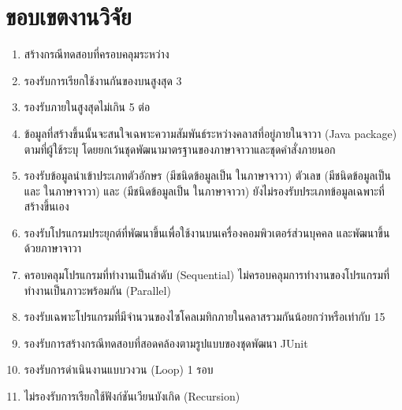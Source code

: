 \section{ขอบเขตงานวิจัย}
\label{sec:limitation}

\begin{enumerate}
    \label{enu:limitation}
    \item สร้างกรณีทดสอบที่ครอบคลุม{\TestPath}ระหว่าง{\CUT} \label{enu:lim:tc}
    \item รองรับการเรียกใช้งานกันของ{\CUT}บน{\TestPath}สูงสุด 3 {\class} \label{enu:lim:3linkingclass}
    \item รองรับ{\method}ภายใน{\CUT}สูงสุดไม่เกิน 5 {\method}ต่อ{\class} \label{enu:lim:5methods}
    \item ข้อมูล{\scg}ที่สร้างขึ้นนั้นจะสนใจเฉพาะความสัมพันธ์ระหว่างคลาสที่อยู่ภายใน{\Package}จาวา (Java package) ตามที่ผู้ใช้ระบุ 
        โดยยกเว้นชุดพัฒนามาตรฐานของภาษาจาวาและชุดคำสั่งภายนอก \label{enu:lim:scg}
    \item รองรับข้อมูลนำเข้าประเภทตัวอักษร (มีชนิดข้อมูลเป็น  ในภาษาจาวา) ตัวเลข 
        (มีชนิดข้อมูลเป็น  และ  ในภาษาจาวา) และ{\enum} 
        (มีชนิดข้อมูลเป็น  ในภาษาจาวา) ยังไม่รองรับประเภทข้อมูลเฉพาะที่สร้างขึ้นเอง \label{enu:lim:datatype}
    \item รองรับโปรแกรมประยุกต์ที่พัฒนาขึ้นเพื่อใช้งานบนเครื่องคอมพิวเตอร์ส่วนบุคคล และ{\sourcecode}พัฒนาขึ้นด้วยภาษาจาวา  \label{enu:lim:datatype}
    \item ครอบคลุมโปรแกรมที่ทำงานเป็นลำดับ (Sequential) ไม่ครอบคลุมการทำงานของโปรแกรมที่ทำงานเป็นภาวะพร้อมกัน (Parallel) \label{enu:lim:seq}
    \item รองรับเฉพาะโปรแกรมที่มีจำนวนของไซโคลเมทิกภายในคลาสรวมกันน้อยกว่าหรือเท่ากับ 15
    \item รองรับการสร้างกรณีทดสอบที่สอดคล้องตามรูปแบบของชุดพัฒนา JUnit
    \item รองรับการดำเนินงานแบบวงวน (Loop) 1 รอบ \label{enu:lim:loop}
    \item ไม่รองรับการเรียกใช้ฟังก์ชันเวียนบังเกิด (Recursion)
\end{enumerate}
